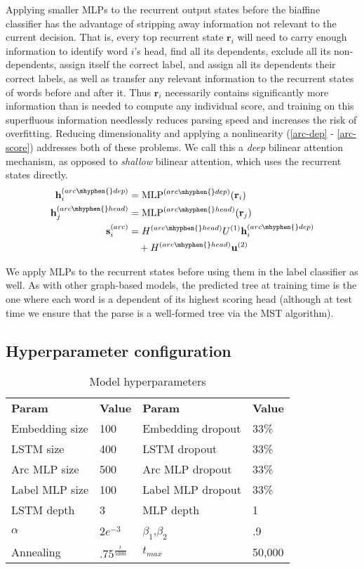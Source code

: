 \documentclass[11pt,a4paper]{article}
\begin{document}
Applying smaller MLPs to the recurrent output states before the biaffine classifier has the advantage of stripping away information not relevant to the current decision. That is, every top recurrent state $\mathbf{r}_i$ will need to carry enough information to identify word $i$'s head, find all its dependents, exclude all its non-dependents, assign itself the correct label, and assign all its dependents their correct labels, as well as transfer any relevant information to the recurrent states of words before and after it. Thus $\mathbf{r}_i$ necessarily contains significantly more information than is needed to compute any individual score, and training on this superfluous information needlessly reduces parsing speed and increases the risk of overfitting. Reducing dimensionality and applying a nonlinearity (\ref{arc-dep} - \ref{arc-score}) addresses both of these problems. We call this a \emph{deep} bilinear attention mechanism, as opposed to \emph{shallow} bilinear attention, which uses the recurrent states directly.
\begin{align}
  \label{arc-dep}\mathbf{h}_i^{(arc\mhyphen{}dep)} &= \text{MLP}^{(arc\mhyphen{}dep)}(\mathbf{r}_i)\\
  \mathbf{h}_j^{(arc\mhyphen{}head)} &= \text{MLP}^{(arc\mhyphen{}head)}(\mathbf{r}_j)\\
  \label{arc-score}\mathbf{s}^{(arc)}_i &= H^{(arc\mhyphen{}head)}U^{(1)}\mathbf{h}^{(arc\mhyphen{}dep)}_i\\ 
  &\nonumber\quad+ H^{(arc\mhyphen{}head)}\mathbf{u}^{(2)}
\end{align}

We apply MLPs to the recurrent states before using them in the label classifier as well. As with other graph-based models, the predicted tree at training time is the one where each word is a dependent of its highest scoring head (although at test time we ensure that the parse is a well-formed tree via the MST algorithm).

\subsection{Hyperparameter configuration}
\begin{table}[ht]
  \begin{center}\small
  \begin{tabular}{llll}
    \bf Param & \bf Value & \bf Param & \bf Value\\
    Embedding size & 100 & Embedding dropout & 33\%\\
    LSTM size & 400 & LSTM dropout & 33\%\\
    Arc MLP size & 500 & Arc MLP dropout & 33\%\\
    Label MLP size & 100 & Label MLP dropout & 33\%\\
    LSTM depth & 3 & MLP depth & 1\\
    $\alpha$ & $2e^{-3}$ & $\beta_1$,$\beta_2$ & .9 \\
    Annealing & $.75^{\frac{t}{5000}}$ & $t_{max}$ & 50,000
  \end{tabular}
  \caption{Model hyperparameters}
  \label{Hyperparams}
  \end{center}
\end{table}
\end{document}
